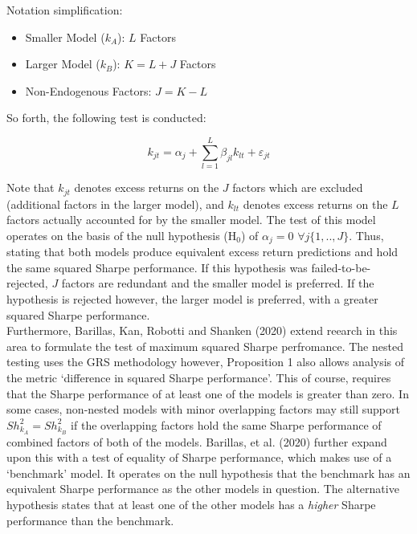 \documentclass[11pt, english]{article}
\begin{document}
        Notation simplification:

        \begin{itemize}
        \setlength\itemsep{0cm}
                \item Smaller Model ($k_{A}$): $L$ Factors
                \item Larger Model ($k_{B}$): $K=L+J$ Factors
                \item Non-Endogenous Factors: $J=K-L$
        \end{itemize}

        So forth, the following test is conducted:

        $$k_{jt}=\alpha_j+\sum_{l=1}^L\beta_{jl}k_{lt}+\varepsilon_{jt}$$

        Note that $k_{jt}$ denotes excess returns on the $J$ factors which are excluded (additional factors in the larger model), and $k_{lt}$ denotes excess returns on the $L$ factors actually accounted for by the smaller model. The test of this model operates on the basis of the null hypothesis (H$_0$) of $\alpha_j=0$ $\forall j\{1,..,J\}$. Thus, stating that both models produce equivalent excess return predictions and hold the same squared Sharpe performance. If this hypothesis was failed-to-be-rejected, $J$ factors are redundant and the smaller model is preferred. If the hypothesis is rejected however, the larger model is preferred, with a greater squared Sharpe performance.\\

        Furthermore, Barillas, Kan, Robotti and Shanken (2020) extend reearch in this area to formulate the test of maximum squared Sharpe perfromance. The nested testing uses the GRS methodology however, Proposition 1 also allows analysis of the metric `difference in squared Sharpe performance'. This of course, requires that the Sharpe performance of at least one of the models is greater than zero. In some cases, non-nested models with minor overlapping factors may still support $Sh_{k_{A}}^2=Sh_{k_{B}}^2$ if the overlapping factors hold the same Sharpe performance of combined factors of both of the models. Barillas, et al. (2020) further expand upon this with a test of equality of Sharpe performance, which makes use of a `benchmark' model. It operates on the null hypothesis that the benchmark has an equivalent Sharpe performance as the other models in question. The alternative hypothesis states that at least one of the other models has a \textit{higher} Sharpe performance than the benchmark.\\
\end{document}
